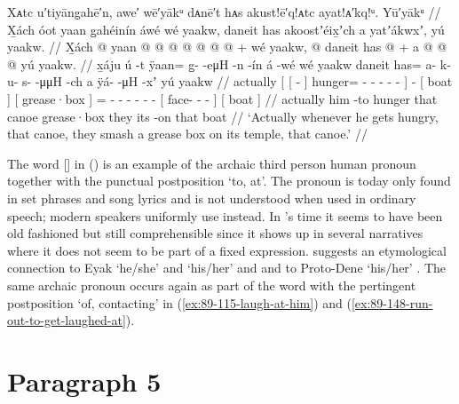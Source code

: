 \ex\label{ex:89-70-smash-grease-box}%
%
\begingl
	\glpreamble	Xᴀtc u′tiyāng̣ahē′n, awe′ wē′yākᵘ dᴀnē′t hᴀs akust!ē′q!ᴀtc ayat!ᴀ′kq!ᵘ.
Yū′yākᵘ //
	\glpreamble	X̱ách óot yaan g̱ahéinín áwé wé yaakw, daneit has akoostʼéix̱ʼch a yatʼákwxʼ, yú yaakw. //
	\gla	X̱ách {} {}  @ {} {}
			yaan @  @ {} @ {} @ {} @ {} @ {} {}
			 @ {} +
		{} wé yaakw, @ {}
		{} daneit {}
		has @  {} {} {} {} {} {} +
		{} a  @ {} @ {} @ {} {}
		{} yú yaakw. {}  //
	\glb	x̱áju {} {} ú -t {}
			ÿaan= {} g̱-  -eμH -n -ín {}
			á -wé
		{} wé yaakw {}
		{} daneit {}
		has= a- k- u- s-  -μμH -ch
		{} a ÿá-  -μH -xʼ {}
		{} yú yaakw {} //
	\glc	actually {}[ {}[  - {}]
			hunger= - -  - - - {}]
			 -
		{}[  boat {}]
		{}[ grease·box {}]
		= - - - -  - -
		{}[  face-  - - {}]
		{}[  boat {}] //
	\gld	actually {} {} him -to {}
			hunger  {} {} {} {} {} {}
			 {}
		{} that canoe {}
		{} grease·box {}
		they  {} {} {} {} {} {}
		{} its  {} {} -on {}
		{} that boat {} //
	\glft	‘Actually whenever he gets hungry, that canoe, they smash a grease box on its temple, that canoe.’
		//
\endgl
\xe

\label{note:089-70-u-pronoun}%
The word  [] in (\lastx) is an example of the archaic third person human pronoun  together with the punctual postposition  ‘to, at’.
The  pronoun is today only found in set phrases and song lyrics and is not understood when used in ordinary speech; modern speakers uniformly use  instead.
In \citeauthor{swanton:1909}’s time it seems to have been old fashioned but still comprehensible since it shows up in several narratives where it does not seem to be part of a fixed expression.
\citeauthor{leer:1978b} suggests an etymological connection to Eyak  ‘he/she’ and  ‘his/her’ and and to Proto-Dene  ‘his/her’ \parencite[9]{leer:1978b}.
The same archaic  pronoun occurs again as part of the word  with the pertingent postposition  ‘of, contacting’ in (\ref{ex:89-115-laugh-at-him}) and (\ref{ex:89-148-run-out-to-get-laughed-at}).

\section{Paragraph 5}\label{sec:89-para-5}

